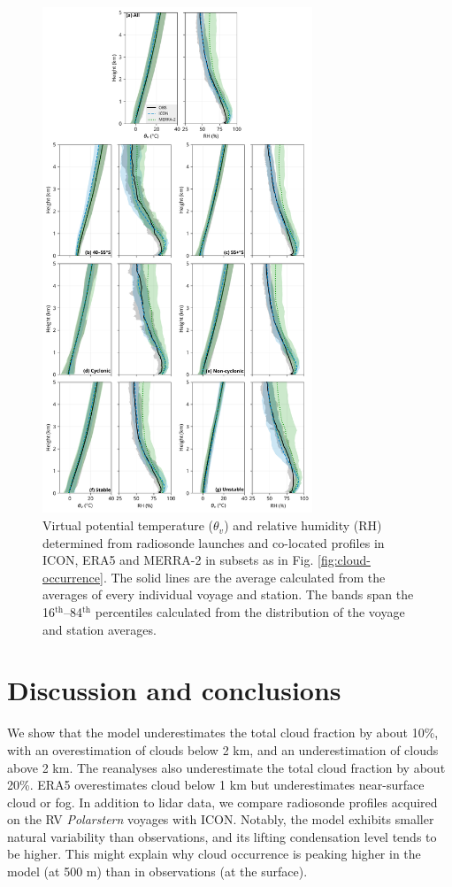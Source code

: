 \documentclass[12pt,a4paper]{article}
\begin{document}
\begin{figure}
\centering
\includegraphics[width=0.72\textwidth]{img/theta_hur.pdf}
\caption{
Virtual potential temperature ($\theta_v$) and relative humidity (RH)
determined from radiosonde launches and co-located profiles in
ICON, ERA5 and MERRA-2 in subsets as in Fig. \ref{fig:cloud-occurrence}.
The solid lines are the average calculated from the averages of every
individual voyage and station. The bands span the
16$^\mathrm{th}$--84$^\mathrm{th}$ percentiles calculated from the distribution
of the voyage and station averages.
}
\label{fig:potential-temperature}
\end{figure}

\section{Discussion and conclusions}

We show that the model underestimates the total cloud fraction by about 10\%,
with an overestimation of clouds below 2 km, and an underestimation of clouds
above 2 km. The reanalyses also underestimate the total cloud fraction by about
20\%.  ERA5 overestimates cloud below 1 km but underestimates near-surface
cloud or fog. In addition to lidar data, we compare radiosonde profiles
acquired on the RV \textit{Polarstern} voyages with ICON. Notably, the model
exhibits smaller natural variability than observations, and its lifting
condensation level tends to be higher. This might explain why cloud occurrence
is peaking higher in the model (at 500 m) than in observations (at the
surface).
\end{document}
